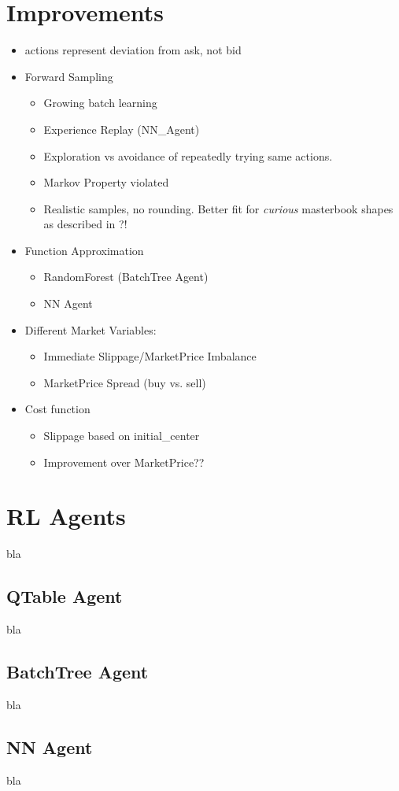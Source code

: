 \section{Improvements}
\begin{itemize}
\item actions represent deviation from ask, not bid
\item Forward Sampling
\begin{itemize}
\item Growing batch learning
\item Experience Replay (NN\_Agent)
\item Exploration vs avoidance of repeatedly trying same actions.
\end{itemize}
\begin{itemize}
\item Markov Property violated
\item Realistic samples, no rounding. Better fit for \emph{curious} masterbook shapes as described in ?!
\end{itemize}
\item Function Approximation
\begin{itemize}
\item RandomForest (BatchTree Agent)
\item NN Agent
\end{itemize}
\item Different Market Variables:
\begin{itemize}
\item Immediate Slippage/MarketPrice Imbalance
\item MarketPrice Spread (buy vs. sell)
\end{itemize}
\item Cost function
\begin{itemize}
\item Slippage based on initial\_center
\item Improvement over MarketPrice??
\end{itemize}
\end{itemize}

\section{RL Agents}
bla

\subsection{QTable Agent}
bla

\subsection{BatchTree Agent}
bla

\subsection{NN Agent}
bla

\cleardoublepage{}